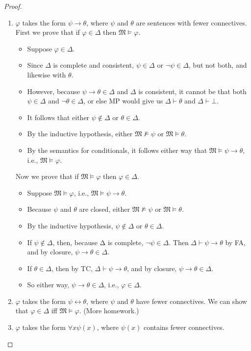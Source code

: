 \documentclass[12pt]{report}
\theoremstyle{nonumberplain}
\newtheorem{proof}{Proof}
\newcommand{\M}{\mathfrak{M}}
\begin{document}
\begin{proof}
\begin{enumerate}
\begin{enumerate}[label={Case (\alph*):}]
\item $φ$ takes the form $ψ → θ$, where $ψ$ and $θ$ are sentences with fewer connectives. First we prove that if $φ ∈Δ$ then $\M ⊨ φ$.
\begin{itemize}[nolistsep,leftmargin=*]
\item Suppose $φ ∈Δ$.
\item Since $Δ$ is complete and consistent, $ψ ∈Δ$ or $¬ψ ∈Δ$, but not both, and likewise with $θ$.
\item However, because $ψ →  θ ∈Δ$ and $Δ$ is consistent, it cannot be that both $ψ ∈Δ$ and $¬θ ∈Δ$, or else MP would give us $Δ ⊢ θ$ and $Δ ⊢ ⊥$.
\item It follows that either $ψ ∉ Δ$ or $θ ∈ Δ$.
\item By the inductive hypothesis, either $\M ⊭ ψ$ or $\M ⊨ θ$.
\item By the semantics for conditionals, it follows either way that $\M ⊨ ψ → θ$, i.e., $\M ⊨ φ$.
\end{itemize}
Now we prove that if $\M ⊨ φ$ then $φ ∈Δ$.
\begin{itemize}[noitemsep]
\item Suppose $\M ⊨ φ$, i.e., $\M ⊨ ψ → θ$.
\item Because $ψ$ and $θ$ are closed, either $\M ⊭ ψ$ or $\M ⊨ θ$.
\item By the inductive hypothesis, $ψ ∉ Δ$ or $θ ∈ Δ$.
\item If $ψ ∉ Δ$, then, because Δ is complete, $¬ψ ∈ Δ$. Then $Δ ⊢ ψ → θ$ by FA, and by closure, $ψ → θ ∈ Δ$.
\item If $θ ∈ Δ$, then by TC, $Δ ⊢ ψ → θ$, and by closure, $ψ → θ ∈ Δ$.
\item So either way, $ψ →  θ ∈ Δ$, i.e., $φ ∈Δ$.
\end{itemize}

\item $φ$ takes the form $ψ ↔ θ$, where $ψ$ and $θ$ have fewer connectives. We can show that $φ ∈ Δ$ iff $\M ⊨ φ$. (More homework.)\label{tm:bicon}

\smallskip


\item $φ$ takes the form $∀x ψ (x)$, where $ψ (x)$ contains fewer connectives.

\smallskip


\end{enumerate}
\end{enumerate}
\end{proof}
\end{document}
